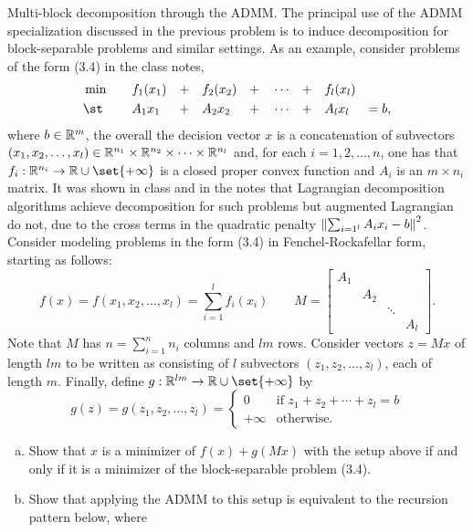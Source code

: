 \documentclass{article}
\begin{document}
\begin{problem}
    {Multi-block decomposition through the ADMM.}
    The principal use of the ADMM specialization discussed in the previous problem is to induce decomposition for block-separable problems and similar settings. As an example, consider problems of the form (3.4) in the class notes,
    \begin{alignat*}{9}
        &\min \quad&& f_1(x_1)&&+&&f_2(x_2)&&+&&\cdots&&+&&f_l(x_l)& \\
        &\st  && A_1x_1&&+&&A_2x_2&&+&&\cdots&&+&&A_lx_l&=b,
    \end{alignat*}
    where $b\in\R^m$, the overall the decision vector $x$ is a concatenation of subvectors $(x_1,x_2,\ldots,x_l) \in \R^{n_1} \times \R^{n_2} \times \cdots \times \R^{n_l}$ and, for each $i=1,2,\ldots,n$, one has that $f_i:\R^{n_i}\rightarrow\R\cup\set{+\infty}$ is a closed proper convex function and $A_i$ is an $m\times n_i$ matrix. It was shown in class and in the notes that Lagrangian decomposition algorithms achieve decomposition for such problems but augmented Lagrangian do not, due to the cross terms in the quadratic penalty $\norm*{\sum_{i=1^l}A_ix_i-b}^2$. Consider modeling problems in the form (3.4) in Fenchel-Rockafellar form, starting as follows:
    \[f(x)=f(x_1,x_2,\ldots,x_l)=\sum_{i=1}^lf_i(x_i)\qquad M=\begin{bmatrix}
        A_1 &&& \\
        & A_2 && \\
        && \ddots & \\
        &&& A_l
    \end{bmatrix}.\]
    Note that $M$ has $n=\sum_{i=1}^{n} n_i$ columns and $lm$ rows. Consider vectors $z=Mx$ of length $lm$ to be written as consisting of $l$ subvectors $(z_1, z_2, \ldots, z_l)$, each of length $m$. Finally, define $g:\R^{lm}\rightarrow\R\cup\set{+\infty}$ by
    \[g(z)=g(z_1,z_2,\ldots,z_l)=\begin{cases}
        0 & \text{if } z_1+z_2+\cdots+z_l=b \\
        +\infty & \text{otherwise}.
    \end{cases}\]
    \begin{enumerate}[(a)]
        \item Show that $x$ is a minimizer of $f(x)+g(Mx)$ with the setup above if and only if it is a minimizer of the block-separable problem (3.4).
        \item Show that applying the ADMM to this setup is equivalent to the recursion pattern below, where

\end{enumerate}
\end{problem}
\end{document}
